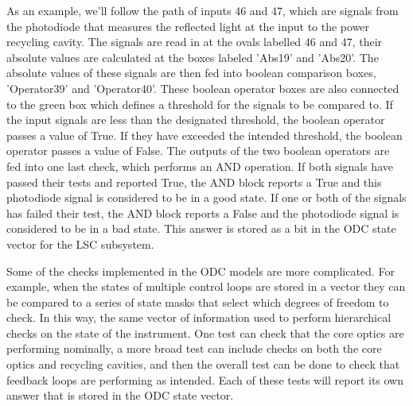 As an example, we'll follow the path of inputs 46 and 47, which are signals from 
the photodiode that measures the reflected light at the input to the power recycling 
cavity. The signals are read in at the ovals labelled 46 and 47, their absolute values 
are calculated at the boxes labeled 'Abs19' and 'Abs20'. The absolute values of these 
signals are then fed into boolean comparison boxes, 'Operator39' and 'Operator40'. 
These boolean operator boxes are also connected to the green box which defines a 
threshold for the signals to be compared to. If the input signals are less than the 
designated threshold, the boolean operator passes a value of True. If they have 
exceeded the intended threshold, the boolean operator passes a value of False. 
The outputs of the two boolean operators are fed into one last check, which performs 
an AND operation. If both signals have passed their tests and reported True, the AND 
block reports a True and this photodiode signal is considered to be in a good state. 
If one or both of the signals has failed their test, the AND block reports a False 
and the photodiode signal is considered to be in a bad state. This answer is stored 
as a bit in the ODC state vector for the LSC subsystem. 

Some of the checks implemented in the ODC models are more complicated. For 
example, when 
the states of multiple control loops are stored in a vector they can be compared to a 
series of state masks that select which degrees of freedom to check. 
In this way, the same vector of information used to perform hierarchical 
checks on the state of the instrument. 
One test can check that the core optics are performing nominally, a more broad 
test can include checks on both the core optics and recycling cavities, and 
then the overall test can be done to check that feedback loops are performing as intended. 
Each of these tests will report its own answer that is stored in the ODC state vector.


